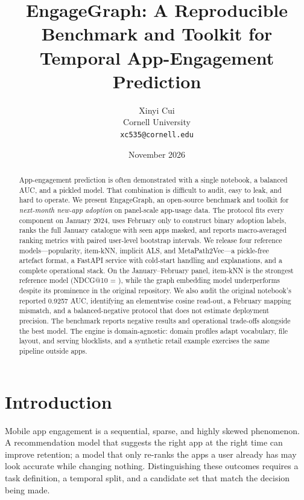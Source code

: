 \documentclass[11pt]{article}
\title{\textbf{EngageGraph}: A Reproducible Benchmark and Toolkit for\\Temporal App-Engagement Prediction}
\author{Xinyi Cui\\Cornell University\\\texttt{xc535@cornell.edu}}
\date{November 2026}
\begin{document}

\maketitle

\begin{abstract}
App-engagement prediction is often demonstrated with a single notebook, a balanced AUC, and a pickled model. That combination is difficult to audit, easy to leak, and hard to operate. We present EngageGraph, an open-source benchmark and toolkit for \emph{next-month new-app adoption} on panel-scale app-usage data. The protocol fits every component on January 2024, uses February only to construct binary adoption labels, ranks the full January catalogue with seen apps masked, and reports macro-averaged ranking metrics with paired user-level bootstrap intervals. We release four reference models---popularity, item-kNN, implicit ALS, and MetaPath2Vec---a pickle-free artefact format, a FastAPI service with cold-start handling and explanations, and a complete operational stack. On the January--February panel, item-kNN is the strongest reference model (NDCG@10 = \BestNDCG), while the graph embedding model underperforms despite its prominence in the original repository. We also audit the original notebook's reported 0.9257 AUC, identifying an elementwise cosine read-out, a February mapping mismatch, and a balanced-negative protocol that does not estimate deployment precision. The benchmark reports negative results and operational trade-offs alongside the best model. The engine is domain-agnostic: domain profiles adapt vocabulary, file layout, and serving blocklists, and a synthetic retail example exercises the same pipeline outside apps.
\end{abstract}

\section{Introduction}

Mobile app engagement is a sequential, sparse, and highly skewed phenomenon. A recommendation model that suggests the right app at the right time can improve retention; a model that only re-ranks the apps a user already has may look accurate while changing nothing. Distinguishing these outcomes requires a task definition, a temporal split, and a candidate set that match the decision being made.
\end{document}
